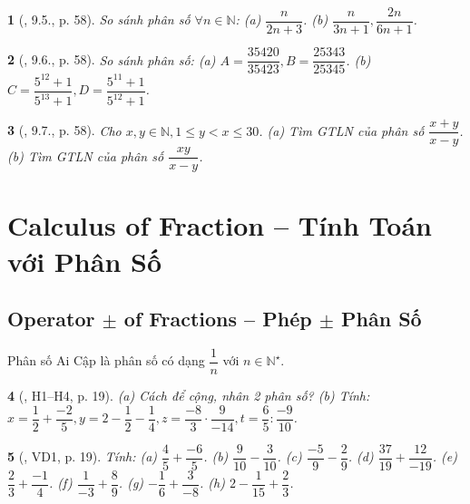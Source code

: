\documentclass{article}
\newtheorem{baitoan}{}
\begin{document}
\begin{baitoan}[\cite{TLCT_THCS_Toan_6_so_hoc}, 9.5., p. 58]
	So sánh phân số $\forall n\in\mathbb{N}$: (a) $\dfrac{n}{2n + 3}$. (b) $\dfrac{n}{3n + 1},\dfrac{2n}{6n + 1}$.
\end{baitoan}

\begin{baitoan}[\cite{TLCT_THCS_Toan_6_so_hoc}, 9.6., p. 58]
	So sánh phân số: (a) $A = \dfrac{35420}{35423},B = \dfrac{25343}{25345}$. (b) $C = \dfrac{5^{12} + 1}{5^{13} + 1},D = \dfrac{5^{11} + 1}{5^{12} + 1}$.
\end{baitoan}

\begin{baitoan}[\cite{TLCT_THCS_Toan_6_so_hoc}, 9.7., p. 58]
	Cho $x,y\in\mathbb{N},1\le y < x\le30$. (a) Tìm {\rm GTLN} của phân số $\dfrac{x + y}{x - y}$. (b) Tìm {\rm GTLN} của phân số $\dfrac{xy}{x - y}$.
\end{baitoan}


\section{Calculus of Fraction -- Tính Toán với Phân Số}

\subsection{Operator $\pm$ of Fractions -- Phép $\pm$ Phân Số}
 Phân số Ai Cập là phân số có dạng $\dfrac{1}{n}$ với $n\in\mathbb{N}^\star$.

\begin{baitoan}[\cite{Binh_boi_duong_Toan_6_tap_2}, H1--H4, p. 19]
	(a) Cách để cộng, nhân 2 phân số? (b) Tính: $x = \dfrac{1}{2} + \dfrac{-2}{5},y = 2 - \dfrac{1}{2} - \dfrac{1}{4},z = \dfrac{-8}{3}\cdot\dfrac{9}{-14},t = \dfrac{6}{5}:\dfrac{-9}{10}$.
\end{baitoan}

\begin{baitoan}[\cite{Binh_boi_duong_Toan_6_tap_2}, VD1, p. 19]
	Tính: (a) $\dfrac{4}{5} + \dfrac{-6}{5}$. (b) $\dfrac{9}{10} - \dfrac{3}{10}$. (c) $\dfrac{-5}{9} - \dfrac{2}{9}$. (d) $\dfrac{37}{19} + \dfrac{12}{-19}$. (e) $\dfrac{2}{3} + \dfrac{-1}{4}$. (f) $\dfrac{1}{-3} + \dfrac{8}{9}$. (g) $-\dfrac{1}{6} + \dfrac{3}{-8}$. (h) $2 - \dfrac{1}{15} + \dfrac{2}{3}$.
\end{baitoan}
\end{document}
